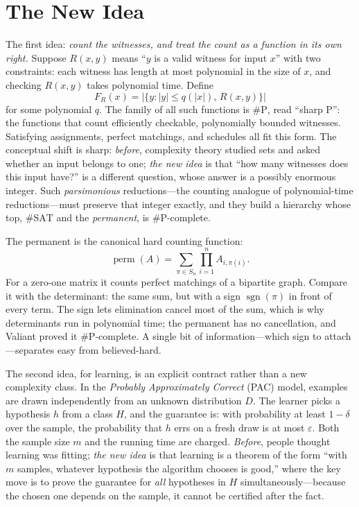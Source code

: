 \section{The New Idea}
The first idea: \emph{count the witnesses, and treat the count as a function in its own right.} Suppose \(R(x,y)\) means ``\(y\) is a valid witness for input \(x\)'' with two constraints: each witness has length at most polynomial in the size of \(x\), and checking \(R(x,y)\) takes polynomial time. Define
\[
F_R(x)=\bigl|\{y:\lvert y\rvert\le q(\lvert x\rvert),\,R(x,y)\}\bigr|
\]
for some polynomial \(q\). The family of all such functions is \(\#\mathrm{P}\), read ``sharp P'': the functions that count efficiently checkable, polynomially bounded witnesses. Satisfying assignments, perfect matchings, and schedules all fit this form. The conceptual shift is sharp: \emph{before}, complexity theory studied sets and asked whether an input belongs to one; \emph{the new idea} is that ``how many witnesses does this input have?'' is a different question, whose answer is a possibly enormous integer. Such \emph{parsimonious} reductions---the counting analogue of polynomial-time reductions---must preserve that integer exactly, and they build a hierarchy whose top, \(\#\mathrm{SAT}\) and the \emph{permanent}, is \(\#\mathrm{P}\)-complete.

The permanent is the canonical hard counting function:
\[
\operatorname{perm}(A)=\sum_{\pi\in S_n}\prod_{i=1}^n A_{i,\pi(i)}.
\]
For a zero-one matrix it counts perfect matchings of a bipartite graph. Compare it with the determinant: the same sum, but with a sign \(\operatorname{sgn}(\pi)\) in front of every term. The sign lets elimination cancel most of the sum, which is why determinants run in polynomial time; the permanent has no cancellation, and Valiant proved it \(\#\mathrm{P}\)-complete. A single bit of information---which sign to attach---separates easy from believed-hard.

The second idea, for learning, is an explicit contract rather than a new complexity class. In the \emph{Probably Approximately Correct} (PAC) model, examples are drawn independently from an unknown distribution \(D\). The learner picks a hypothesis \(h\) from a class \(H\), and the guarantee is: with probability at least \(1-\delta\) over the sample, the probability that \(h\) errs on a fresh draw is at most \(\varepsilon\). Both the sample size \(m\) and the running time are charged. \emph{Before}, people thought learning was fitting; \emph{the new idea} is that learning is a theorem of the form ``with \(m\) samples, whatever hypothesis the algorithm chooses is good,'' where the key move is to prove the guarantee for \emph{all} hypotheses in \(H\) simultaneously---because the chosen one depends on the sample, it cannot be certified after the fact.

